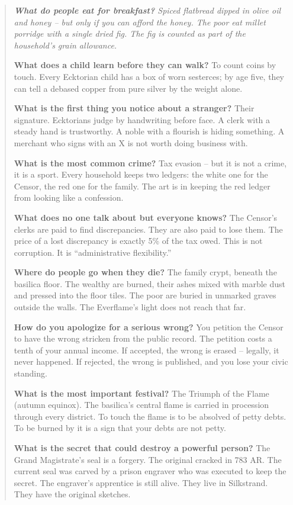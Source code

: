 \documentclass[12pt,oneside]{book}
\newenvironment{almanac}
  {\begin{quote}\small\itshape}
  {\end{quote}}
\begin{document}
\vspace{1em}
\begin{almanac}
\textbf{What do people eat for breakfast?} Spiced flatbread dipped in olive oil and honey -- but only if you can afford the honey. The poor eat millet porridge with a single dried fig. The fig is counted as part of the household's grain allowance.

\textbf{What does a child learn before they can walk?} To count coins by touch. Every Ecktorian child has a box of worn sesterces; by age five, they can tell a debased copper from pure silver by the weight alone.

\textbf{What is the first thing you notice about a stranger?} Their signature. Ecktorians judge by handwriting before face. A clerk with a steady hand is trustworthy. A noble with a flourish is hiding something. A merchant who signs with an X is not worth doing business with.

\textbf{What is the most common crime?} Tax evasion -- but it is not a crime, it is a sport. Every household keeps two ledgers: the white one for the Censor, the red one for the family. The art is in keeping the red ledger from looking like a confession.

\textbf{What does no one talk about but everyone knows?} The Censor's clerks are paid to find discrepancies. They are also paid to lose them. The price of a lost discrepancy is exactly 5\% of the tax owed. This is not corruption. It is ``administrative flexibility.''

\textbf{Where do people go when they die?} The family crypt, beneath the basilica floor. The wealthy are burned, their ashes mixed with marble dust and pressed into the floor tiles. The poor are buried in unmarked graves outside the walls. The Everflame's light does not reach that far.

\textbf{How do you apologize for a serious wrong?} You petition the Censor to have the wrong stricken from the public record. The petition costs a tenth of your annual income. If accepted, the wrong is erased -- legally, it never happened. If rejected, the wrong is published, and you lose your civic standing.

\textbf{What is the most important festival?} The Triumph of the Flame (autumn equinox). The basilica's central flame is carried in procession through every district. To touch the flame is to be absolved of petty debts. To be burned by it is a sign that your debts are not petty.

\textbf{What is the secret that could destroy a powerful person?} The Grand Magistrate's seal is a forgery. The original cracked in 783 AR. The current seal was carved by a prison engraver who was executed to keep the secret. The engraver's apprentice is still alive. They live in Silkstrand. They have the original sketches.
\end{almanac}
\end{document}
